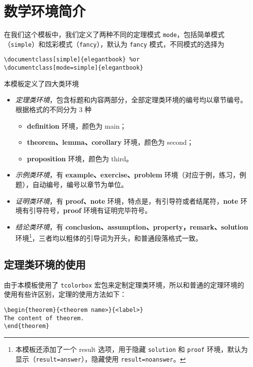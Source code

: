 \documentclass[cn,11pt,fancy,hide]{elegantbook}
\begin{document}
\section{数学环境简介}

在我们这个模板中，我们定义了两种不同的定理模式 \lstinline{mode}，包括简单模式（\lstinline{simple}）和炫彩模式（\lstinline{fancy}），默认为 \lstinline{fancy} 模式，不同模式的选择为
\begin{lstlisting}
\documentclass[simple]{elegantbook} %or
\documentclass[mode=simple]{elegantbook}
\end{lstlisting}

本模板定义了四大类环境

\begin{itemize}
\item \textit{定理类环境}，包含标题和内容两部分，全部定理类环境的编号均以章节编号。根据格式的不同分为 3 种
   \begin{itemize}
      \item \textcolor{main}{\textbf{definition}} 环境，颜色为 \textcolor{main}{main}；
      \item \textcolor{second}{\textbf{theorem、lemma、corollary}} 环境，颜色为 \textcolor{second} {second}；
      \item \textcolor{third}{\textbf{proposition}} 环境，颜色为 \textcolor{third}{third}。
   \end{itemize}
\item \textit{示例类环境}，有 \textbf{example、exercise、problem} 环境（对应于例，练习，例题），自动编号，编号以章节为单位。
\item \textit{证明类环境}，有 \textbf{proof、note} 环境，特点是，有引导符或者结尾符，\textbf{note} 环境有引导符号，\textbf{proof} 环境有证明完毕符号。
\item \textit{结论类环境}，有 \textbf{conclusion、assumption、property，remark、solution} 环境\footnote{本模板还添加了一个 result 选项，用于隐藏 \lstinline{solution} 和 \lstinline{proof} 环境，默认为显示（\lstinline{result=answer}），隐藏使用 \lstinline{result=noanswer}。}，三者均以粗体的引导词为开头，和普通段落格式一致。
\end{itemize}

\subsection{定理类环境的使用}
由于本模板使用了 \lstinline{tcolorbox} 宏包来定制定理类环境，所以和普通的定理环境的使用有些许区别，定理的使用方法如下：
\begin{lstlisting}
\begin{theorem}{<theorem name>}{<label>}
The content of theorem.
\end{theorem}
\end{lstlisting}
\end{document}
